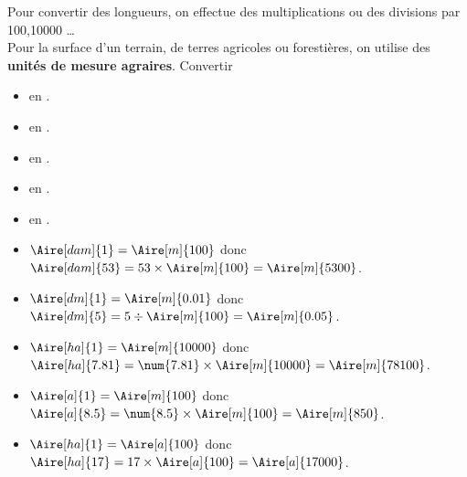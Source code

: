 \begin{changemargin}{0mm}{-20mm}
\begin{methode}
    Pour convertir des longueurs, on effectue des multiplications ou des divisions par 100,\num{10 000} \dots \\
    Pour la surface d'un terrain, de terres agricoles ou forestières, on utilise des \textbf{unités de mesure agraires}.
    \exercice
        Convertir 
        \begin{itemize}
            \item {} en \Aire[m]{}.
            \item {} en \Aire[m]{}.
            \item {} en \Aire[m]{}.
            \item {} en \Aire[m]{}.
            \item {} en \Aire[a]{}.
        \end{itemize}
    \correction
        \begin{itemize}
            \item $\Aire[dam]{1} = \Aire[m]{100}$   donc $\Aire[dam]{53}  = 53 \times \Aire[m]{100}           = \Aire[m]{5300}$.
            \item $\Aire[dm]{1}  = \Aire[m]{0.01}$  donc $\Aire[dm]{5}    = 5 \div \Aire[m]{100}              = \Aire[m]{0.05}$.
            \item $\Aire[ha]{1}  = \Aire[m]{10000}$ donc $\Aire[ha]{7.81} = \num{7.81} \times \Aire[m]{10000} = \Aire[m]{78100}$.
            \item $\Aire[a]{1}   = \Aire[m]{100}$   donc $\Aire[a]{8.5}   = \num{8.5} \times \Aire[m]{100}    = \Aire[m]{850}$.
            \item $\Aire[ha]{1}  = \Aire[a]{100}$   donc $\Aire[ha]{17}   = 17 \times \Aire[a]{100}           = \Aire[a]{17000}$.
        \end{itemize}
\end{methode}
\end{changemargin}
